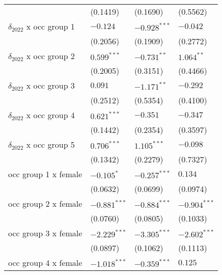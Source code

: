 \begin{tabular}{llll}
                                       &           (0.1419) &           (0.1690) &           (0.5562) \\
$\delta_{2022}$ x occ group 1          &           $-0.124$ &     $-0.928^{***}$ &           $-0.042$ \\
                                       &           (0.2056) &           (0.1909) &           (0.2772) \\
$\delta_{2022}$ x occ group 2          &      $0.599^{***}$ &      $-0.731^{**}$ &       $1.064^{**}$ \\
                                       &           (0.2005) &           (0.3151) &           (0.4466) \\
$\delta_{2022}$ x occ group 3          &            $0.091$ &      $-1.171^{**}$ &           $-0.292$ \\
                                       &           (0.2512) &           (0.5354) &           (0.4100) \\
$\delta_{2022}$ x occ group 4          &      $0.621^{***}$ &           $-0.351$ &           $-0.347$ \\
                                       &           (0.1442) &           (0.2354) &           (0.3597) \\
$\delta_{2022}$ x occ group 5          &      $0.706^{***}$ &      $1.105^{***}$ &           $-0.098$ \\
                                       &           (0.1342) &           (0.2279) &           (0.7327) \\
occ group 1 x female                   &         $-0.105^*$ &     $-0.257^{***}$ &            $0.134$ \\
                                       &           (0.0632) &           (0.0699) &           (0.0974) \\
occ group 2 x female                   &     $-0.881^{***}$ &     $-0.884^{***}$ &     $-0.904^{***}$ \\
                                       &           (0.0760) &           (0.0805) &           (0.1033) \\
occ group 3 x female                   &     $-2.229^{***}$ &     $-3.305^{***}$ &     $-2.602^{***}$ \\
                                       &           (0.0897) &           (0.1062) &           (0.1113) \\
occ group 4 x female                   &     $-1.018^{***}$ &     $-0.359^{***}$ &            $0.125$ \\

\end{tabular}
